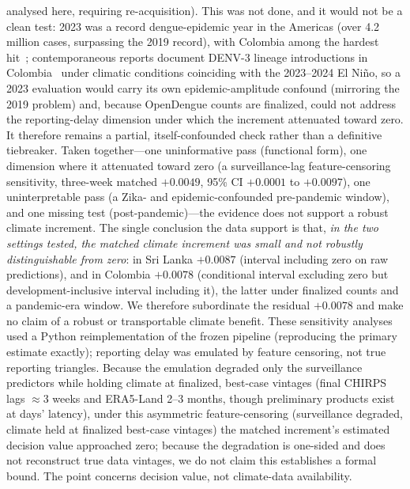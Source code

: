 \documentclass[11pt,a4paper]{article}
\begin{document}
analysed here, requiring re-acquisition). This was not done, and it would not be a clean test: 2023 was a record dengue-epidemic year in the Americas (over 4.2 million cases, surpassing the 2019 record), with Colombia among the hardest hit~\cite{PAHO2023}; contemporaneous reports document DENV-3 lineage introductions in Colombia~\cite{ValleDelCauca2024} under climatic conditions coinciding with the 2023--2024 El Ni\~no, so a 2023 evaluation would carry its own epidemic-amplitude confound (mirroring the 2019 problem) and, because OpenDengue counts are finalized, could not address the reporting-delay dimension under which the increment attenuated toward zero. It therefore remains a partial, itself-confounded check rather than a definitive tiebreaker. Taken together---one uninformative pass (functional form), one dimension where it attenuated toward zero (a surveillance-lag feature-censoring sensitivity, three-week matched $+0.0049$, 95\% CI $+0.0001$ to $+0.0097$), one uninterpretable pass (a Zika- and epidemic-confounded pre-pandemic window), and one missing test (post-pandemic)---the evidence does not support a robust climate increment. The single conclusion the data support is that, \emph{in the two settings tested, the matched climate increment was small and not robustly distinguishable from zero}: in Sri Lanka $+0.0087$ (interval including zero on raw predictions), and in Colombia $+0.0078$ (conditional interval excluding zero but development-inclusive interval including it), the latter under finalized counts and a pandemic-era window. We therefore subordinate the residual $+0.0078$ and make no claim of a robust or transportable climate benefit. These sensitivity analyses used a Python reimplementation of the frozen pipeline (reproducing the primary estimate exactly); reporting delay was emulated by feature censoring, not true reporting triangles. Because the emulation degraded only the surveillance predictors while holding climate at finalized, best-case vintages (final CHIRPS lags $\approx$3 weeks and ERA5-Land 2--3 months, though preliminary products exist at days' latency), under this asymmetric feature-censoring (surveillance degraded, climate held at finalized best-case vintages) the matched increment's estimated decision value approached zero; because the degradation is one-sided and does not reconstruct true data vintages, we do not claim this establishes a formal bound. The point concerns decision value, not climate-data availability.
\end{document}
